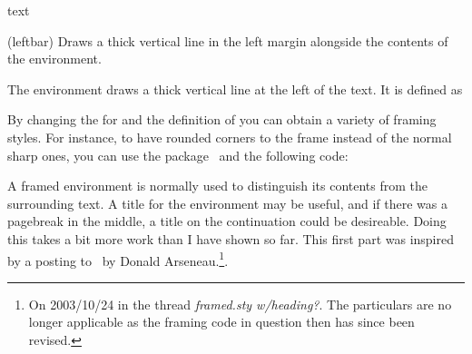 \begin{syntax}
 text  \\
\end{syntax}
\glossary(leftbar)%
  {}%
  {Draws a thick vertical line in the left margin alongside the contents 
   of the environment.}

The  environment draws a thick vertical line at the 
left of the text. It is defined as
\begin{lcode}
\newenvironment{leftbar}{%
  \def\FrameCommand{\vrule width 3pt \hspace{10pt}}%
  \MakeFramed{\advance\hsize -\width \FrameRestore}}%
  {\endMakeFramed}
\end{lcode}

    By changing the  for \cmd{\MakeFramed} and the
definition of \cmd{\FrameCommand} you can obtain a variety of framing
styles. For instance, to have rounded corners to the 
frame instead of
the normal sharp ones, you can use the  
package~\cite{FANCYBOX} and the following code:
\begin{lcode}
\usepackage{fancybox}
\newenvironment{roundedframe}{%
  \def\FrameCommand{%
    \cornersize*{20pt}%
    \setlength{\fboxsep}{5pt}%
    \ovalbox}%
  \MakeFramed{\advance\hsize-\width \FrameRestore}}%
  {\endMakeFramed}
\end{lcode}

     A framed environment is normally used to distinguish its contents
from the surrounding text. A title for the environment may be useful, and
if there was a pagebreak in the middle, a title on the continuation could
be desireable. Doing this takes a bit more work than I have shown so far.
This first part was inspired by a posting to \ctt\ by 
Donald Arseneau.\footnote{On 2003/10/24 in the thread
\textit{framed.sty w/heading?}. The particulars are no longer applicable as 
the framing code in question then has since been revised.}.
\begin{comment}
This first part is from a posting to \ctt\ by 
Donald Arseneau\index{Arseneau, Donald}.\footnote{On 2003/10/24 in the thread
\textit{framed.sty w/heading?}}.

\begin{lcode}
\newcommand{\FrameTitle}[2]{%
  \fboxrule=\FrameRule \fboxsep=\FrameSep
  \fbox{\vbox{\nobreak \vskip -0.7\FrameSep
    \rlap{\strut#1}\nobreak\nointerlineskip%
    \vskip 0.7\FrameSep
    \hbox{#2}}}}
\newenvironment{framewithtitle}[2][\FrameFirst@Lab\ (cont.)]{%
  \def\FrameFirst@Lab{\textbf{#2}}%
  \def\FrameCont@Lab{\textbf{#1}}%
  \def\FrameCommand##1{%
    \FrameTitle{\FrameCurrent@Lab}{##1}%
    \global\let\FrameCurrent@Lab\FrameNext@Lab
    \global\let\FrameNext@Lab\FrameCont@Lab
  }%
  \global\let\FrameCurrent@Lab\FrameFirst@Lab
  \global\let\FrameNext@Lab\FrameFirst@Lab
  \MakeFramed{\advance\hsize-\width \FrameRestore}}%
  {\endMakeFramed}
\end{lcode}
\end{comment}

